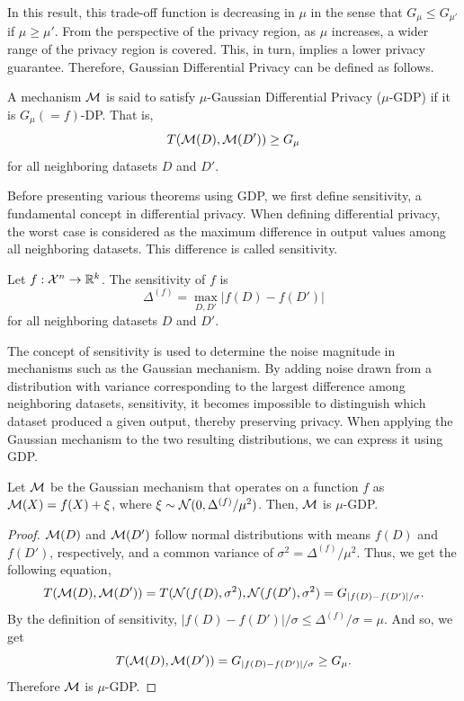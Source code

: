 \documentclass{article}
\begin{document}
In this result, this trade-off function is decreasing in $\mu$ in the sense that $G_\mu \le G_{\mu'}$ if $\mu \ge \mu'$. From the perspective of the privacy region, as $\mu$ increases, a wider range of the privacy region is covered. This, in turn, implies a lower privacy guarantee. Therefore, Gaussian Differential Privacy can be defined as follows.
\begin{definition}
    A mechanism ${\mathcal{M}}$ is said to satisfy $\mu$-Gaussian Differential Privacy ($\mu$-GDP) if it is $G_\mu (=f)$-DP. That is,
    \begin{equation*}
        T({\mathcal{M}}(D), {\mathcal{M}}(D')) \ge G_\mu
    \end{equation*}
    for all neighboring datasets $D$ and $D'$. 
\end{definition}

Before presenting various theorems using GDP, we first define sensitivity, a fundamental concept in differential privacy. When defining differential privacy, the worst case is considered as the maximum difference in output values among all neighboring datasets. This difference is called sensitivity.

\begin{definition}[Sensitivity]
    Let $f: {\mathcal{X}}^n \to \mathbb{R}^k$. The sensitivity of $f$ is
    \begin{equation*}
        \Delta^{(f)} = \max_{D,D'} |f(D)-f(D')|
    \end{equation*}
    for all neighboring datasets $D$ and $D'$.
\end{definition}
The concept of sensitivity is used to determine the noise magnitude in mechanisms such as the Gaussian mechanism. By adding noise drawn from a distribution with variance corresponding to the largest difference among neighboring datasets, sensitivity, it becomes impossible to distinguish which dataset produced a given output, thereby preserving privacy. When applying the Gaussian mechanism to the two resulting distributions, we can express it using GDP.

\begin{theorem}
    Let ${\mathcal{M}}$ be the Gaussian mechanism that operates on a function $f$ as ${\mathcal{M}}(X) = f(X) + \xi$, where $\xi \sim {\mathcal{N}}(0, \Delta^{(f)}/\mu^2)$. Then, ${\mathcal{M}}$ is $\mu$-GDP.

\begin{proof}
    ${\mathcal{M}}(D)$ and ${\mathcal{M}}(D')$ follow normal distributions with means $f(D)$ and $f(D')$, respectively, and a common variance of $\sigma^2 = \Delta^{(f)}/\mu^2$. Thus, we get the following equation,
    \begin{equation*}
        T({\mathcal{M}}(D),{\mathcal{M}}(D')) = T({\mathcal{N}}(f(D),\sigma^2),{\mathcal{N}}(f(D'),\sigma^2) = G_{|f(D)-f(D')|/\sigma}. 
    \end{equation*}
By the definition of sensitivity, $|f(D)-f(D')|/\sigma \le \Delta^{(f)}/\sigma = \mu$. And so, we get
\begin{equation*}
    T({\mathcal{M}}(D),{\mathcal{M}}(D')) = G_{|f(D)-f(D')|/\sigma} \ge G_\mu.
\end{equation*}
Therefore ${\mathcal{M}}$ is $\mu$-GDP.
\end{proof}
\end{theorem}
\end{document}
